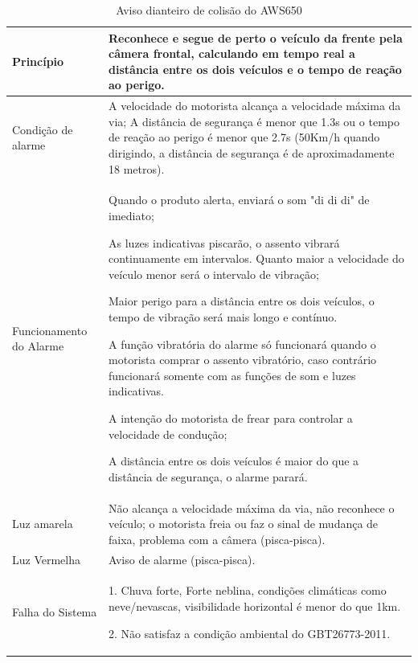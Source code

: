 \begin{table}[ht]
\caption{Aviso dianteiro de colisão do AWS650}
\centering
\begin{tabular}{| l |  p{10cm} |}
\hline
Princípio & Reconhece e segue de perto o veículo da frente pela câmera frontal, calculando em tempo real a distância entre os dois veículos e o tempo de reação ao perigo. \\
\hline
Condição de alarme & A velocidade do motorista alcança a velocidade máxima da via;
A distância de segurança é menor que 1.3s ou o tempo de reação ao perigo é menor que 2.7s (50Km/h quando dirigindo, a distância de segurança é de aproximadamente 18 metros).
\\
\hline
Funcionamento do Alarme & Quando o produto alerta, enviará o som "di di di" de imediato;

As luzes indicativas piscarão, o assento vibrará continuamente em intervalos. Quanto maior a velocidade do veículo menor será o intervalo de vibração;

Maior perigo para a distância entre os dois veículos, o tempo de vibração será mais longo e contínuo.

A função vibratória do alarme só funcionará quando o motorista comprar o assento vibratório, caso contrário funcionará somente com as funções de som e luzes indicativas.

A intenção do motorista de frear para controlar a velocidade de condução;

A distância entre os dois veículos é maior do que a distância de segurança, o alarme parará.
 \\
\hline
Luz amarela & Não alcança a velocidade máxima da via, não reconhece o veículo; o motorista freia ou faz o sinal de mudança de faixa, problema com a câmera (pisca-pisca).
 \\
\hline
Luz Vermelha & Aviso de alarme (pisca-pisca). \\
\hline
Falha do Sistema & 1. Chuva forte, Forte neblina, condições climáticas como neve/nevascas, visibilidade horizontal é menor do que 1km.

2.   Não satisfaz a condição ambiental do GBT26773-2011. \\
\hline
\end{tabular}
\label{table:aviso_dianteiro}
\end{table}


